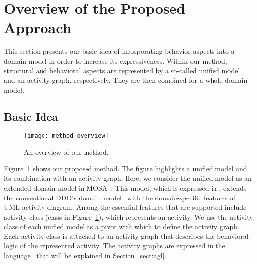 \section{Overview of the Proposed Approach}
\label{sect:overviewApproach}

This section presents our basic idea of incorporating behavior aspects into a domain model in order to increase its expressiveness. Within our method, structural and behavioral aspects are represented by a so-called unified model and an activity graph, respectively. They are then combined for a whole domain model.

\subsection{Basic Idea}

\begin{figure}[ht]
\begin{center}
\texttt{[image: method-overview]}
\end{center}
\caption{An overview of our method.} %
\label{fig:method-overview}
\end{figure}

%
%
Figure~\ref{fig:method-overview} shows our proposed method.
The figure highlights a unified model and its combination with an activity graph. Here, we consider the unified model as an extended domain model in MOSA~\cite{le_domain_2018}. This model, which is expressed in \dcsl, extends the conventional DDD's domain model~\cite{evans_domain-driven_2004} with the domain-specific features of UML activity diagram. Among the essential features that are supported include activity class (\eg class  in Figure~\ref{fig:method-overview}), which represents an activity. We use the activity class of each unified model as a pivot with which to define the activity graph. Each activity class is attached to an activity graph that describes the behavioral logic of the represented activity. The activity graphs are expressed in the language \agl~that will be explained in Section~\ref{sect:agl}.

